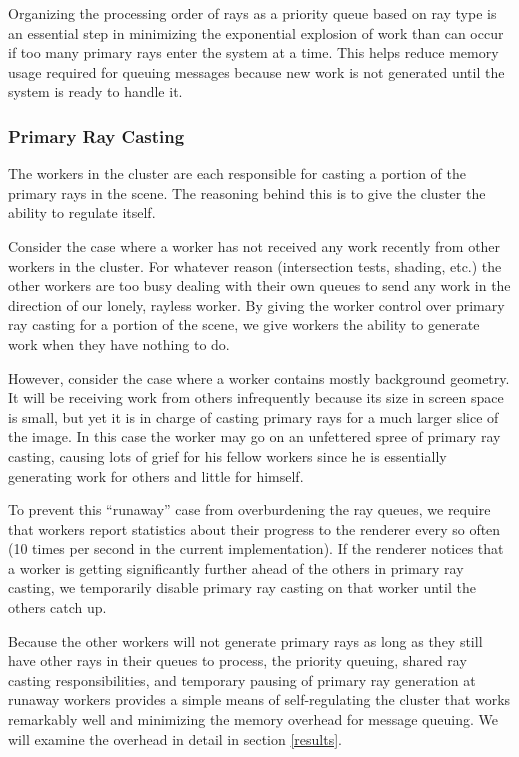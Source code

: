 \documentclass[a4paper,twoside]{article}
\begin{document}
Organizing the processing order of rays as a priority queue based on ray type
is an essential step in minimizing the exponential explosion of work than can
occur if too many primary rays enter the system at a time. This helps reduce
memory usage required for queuing messages because new work is not generated
until the system is ready to handle it.

\subsubsection{Primary Ray Casting}
\label{primaryrays}

The workers in the cluster are each responsible for casting a portion of the
primary rays in the scene. The reasoning behind this is to give the cluster
the ability to regulate itself.

Consider the case where a worker has not received any work recently from other
workers in the cluster. For whatever reason (intersection tests, shading, etc.)
the other workers are too busy dealing with their own queues to send any work
in the direction of our lonely, rayless worker. By giving the worker control
over primary ray casting for a portion of the scene, we give workers the ability
to generate work when they have nothing to do.

However, consider the case where a worker contains mostly background
geometry. It will be receiving work from others infrequently because its size
in screen space is small, but yet it is in charge of casting primary rays for
a much larger slice of the image. In this case the worker may go on an
unfettered spree of primary ray casting, causing lots of grief for his fellow
workers since he is essentially generating work for others and little for
himself.

To prevent this ``runaway'' case from overburdening the ray queues, we require
that workers report statistics about their progress to the renderer every so
often (10 times per second in the current implementation). If the renderer
notices that a worker is getting significantly further ahead of the others in
primary ray casting, we temporarily disable primary ray casting on that worker
until the others catch up.

Because the other workers will not generate primary rays as long as they still
have other rays in their queues to process, the priority queuing, shared
ray casting responsibilities, and temporary pausing of primary ray generation at
runaway workers provides a simple means of self-regulating the cluster that
works remarkably well and minimizing the memory overhead for message queuing.
We will examine the overhead in detail in section \ref{results}.
\end{document}
